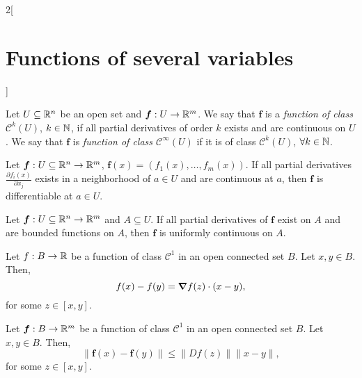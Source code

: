 \documentclass[../../../main.tex]{subfiles}
\begin{document}
\begin{multicols}{2}[\section{Functions of several variables}]
\begin{theorem}
    \end{theorem}
    \begin{definition}
        Let $U\subseteq\mathbb{R}^n$ be an open set and $\boldsymbol{f}:U\rightarrow\mathbb{R}^m$. We say that $\boldsymbol{f}$ is a \textit{function of class $\mathcal{C}^k(U)$}, $k\in\mathbb{N} $, if all partial derivatives of order $k$ exists and are continuous on $U$. We say that $\boldsymbol{f}$ is \textit{function of class $\mathcal{C}^\infty(U)$} if it is of class $\mathcal{C}^k(U)$, $\forall k\in\mathbb{N} $.
    \end{definition}
    \begin{theorem}
        Let $\boldsymbol{f}:U\subseteq\mathbb{R}^n\rightarrow\mathbb{R}^m$, $\boldsymbol{f}(x)=(f_1(x),\ldots,f_m(x))$. If all partial derivatives $\displaystyle \frac{\partial f_i(x)}{\partial x_j}$ exists in a neighborhood of $a\in U$ and are continuous at $a$, then $\boldsymbol{f}$ is differentiable at $a\in U$.
    \end{theorem}
    \begin{prop}
        Let $\boldsymbol{f}:U\subseteq\mathbb{R}^n\rightarrow\mathbb{R}^m$ and $A\subseteq U$. If all partial derivatives of $\boldsymbol{f}$ exist on $A$ and are bounded functions on $A$, then $\boldsymbol{f}$ is uniformly continuous on $A$.
    \end{prop}
    \begin{theorem}
        Let $f:B\rightarrow\mathbb{R} $ be a function of class $\mathcal{C}^1$ in an open connected set $B$. Let $x,y\in B$. Then, $$f(x)-f(y)=\grad f(z)\cdot(x-y),$$ for some $z\in[x,y]$.
    \end{theorem}
    \begin{theorem}
        Let $\boldsymbol{f}:B\rightarrow\mathbb{R}^m$ be a function of class $\mathcal{C}^1$ in an open connected set $B$. Let $x,y\in B$. Then, $$\|\boldsymbol{f}(x)-\boldsymbol{f}(y)\|\leq\|Df(z)\|\|x-y\|,$$ for some $z\in[x,y]$.
    \end{theorem}

\end{multicols}
\end{document}
